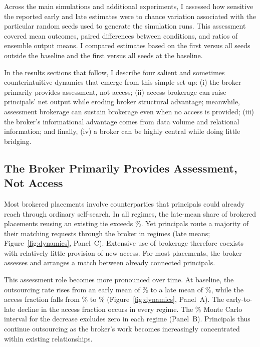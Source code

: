 Across the main simulations and additional experiments, I assessed how sensitive the reported early and late estimates were to chance variation associated with the particular random seeds used to generate the simulation runs. This assessment covered mean outcomes, paired differences between conditions, and ratios of ensemble output means. I compared estimates based on the first  versus all  seeds outside the baseline and the first  versus all  seeds at the baseline.

In the results sections that follow, I describe four salient and sometimes counterintuitive dynamics that emerge from this simple set-up: (i) the broker primarily provides assessment, not access; (ii) access brokerage can raise principals' net output while eroding broker structural advantage; meanwhile, assessment brokerage can sustain brokerage even when no access is provided; (iii) the broker's informational advantage comes from data volume and relational information; and finally, (iv) a broker can be highly central while doing little bridging.

\subsection{The Broker Primarily Provides Assessment, Not Access}

Most brokered placements involve counterparties that principals could already reach through ordinary self-search. In all  regimes, the late-mean share of brokered placements reusing an existing tie exceeds \%. Yet principals route a majority of their matching requests through the broker in  regimes (late means; Figure~\ref{fig:dynamics}, Panel~C). Extensive use of brokerage therefore coexists with relatively little provision of new access. For most placements, the broker assesses and arranges a match between already connected principals.

This assessment role becomes more pronounced over time. At baseline, the outsourcing rate rises from an early mean of \% to a late mean of \%, while the access fraction falls from \% to \% (Figure~\ref{fig:dynamics}, Panel~A). The early-to-late decline in the access fraction occurs in every regime. The \% Monte Carlo interval for the decrease excludes zero in each regime (Panel~B). Principals thus continue outsourcing as the broker's work becomes increasingly concentrated within existing relationships.


